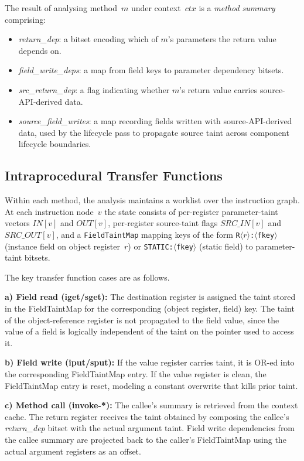 \documentclass[conference]{IEEEtran}
\begin{document}
The result of analysing method~$m$ under context~$\mathit{ctx}$ is a
\emph{method summary} comprising:
\begin{itemize}
  \item \emph{return\_dep}: a bitset encoding which of $m$'s parameters the
  return value depends on.
  \item \emph{field\_write\_deps}: a map from field keys to parameter dependency
  bitsets.
  \item \emph{src\_return\_dep}: a flag indicating whether $m$'s return value
  carries source-API-derived data.
  \item \emph{source\_field\_writes}: a map recording fields written with
  source-API-derived data, used by the lifecycle pass to propagate source taint
  across component lifecycle boundaries.
\end{itemize}

\subsection{Intraprocedural Transfer Functions}

Within each method, the analysis maintains a worklist over the instruction graph.
At each instruction node~$v$ the state consists of per-register parameter-taint
vectors $\mathit{IN}[v]$ and $\mathit{OUT}[v]$, per-register source-taint flags
$\mathit{SRC\_IN}[v]$ and $\mathit{SRC\_OUT}[v]$, and a \texttt{FieldTaintMap}
mapping keys of the form \texttt{R$\langle r\rangle$:$\langle$fkey$\rangle$}
(instance field on object register~$r$) or \texttt{STATIC:$\langle$fkey$\rangle$}
(static field) to parameter-taint bitsets.

The key transfer function cases are as follows.

\textbf{a) Field read (iget/sget):} The destination register is assigned the
taint stored in the FieldTaintMap for the corresponding (object register, field)
key. The taint of the object-reference register is not propagated to the field
value, since the value of a field is logically independent of the taint on the
pointer used to access it.

\textbf{b) Field write (iput/sput):} If the value register carries taint, it is
OR-ed into the corresponding FieldTaintMap entry. If the value register is clean,
the FieldTaintMap entry is reset, modeling a constant overwrite that kills prior
taint.

\textbf{c) Method call (invoke-*):} The callee's summary is retrieved from the
context cache. The return register receives the taint obtained by composing the
callee's \emph{return\_dep} bitset with the actual argument taint. Field write
dependencies from the callee summary are projected back to the caller's
FieldTaintMap using the actual argument registers as an offset.
\end{document}
